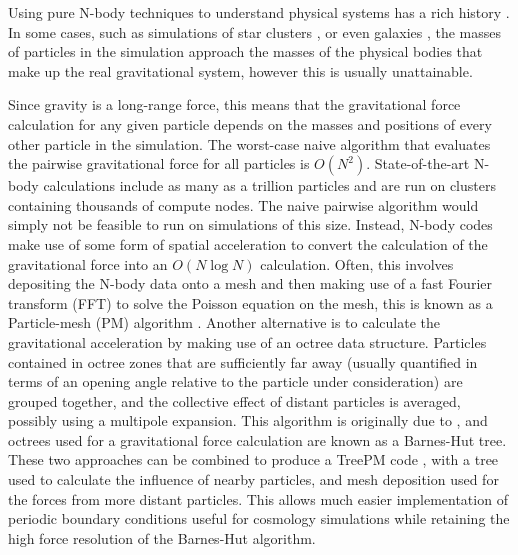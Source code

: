 \documentclass[11pt,twoside]{article}
\begin{document}
Using pure N-body techniques to understand physical systems has a rich history \citep[see e.g.\ ][]{holmberg1941, hoerner1960, peebles1970, press1974}. In some cases, such as simulations of star clusters \citep{wang2016}, or even galaxies \citep{bedorf2014}, the masses of particles in the simulation approach the masses of the physical bodies that make up the real gravitational system, however this is usually unattainable.

Since gravity is a long-range force, this means that the gravitational force calculation for any given particle depends on the masses and positions of every other particle in the simulation. The worst-case naive algorithm that evaluates the pairwise gravitational force for all particles is $O(N^2)$. State-of-the-art N-body calculations include as many as a trillion particles and are run on clusters containing thousands of compute nodes. The naive pairwise algorithm would simply not be feasible to run on simulations of this size. Instead, N-body codes make use of some form of spatial acceleration to convert the calculation of the gravitational force into an $O(N \log N)$ calculation. Often, this involves depositing the N-body data onto a mesh and then making use of a fast Fourier transform (FFT) to solve the Poisson equation on the mesh, this is known as a Particle-mesh (PM) algorithm \citep{hockney1988}. Another alternative is to calculate the gravitational acceleration by making use of an octree data structure. Particles contained in octree zones that are sufficiently far away (usually quantified in terms of an opening angle relative to the particle under consideration) are grouped together, and the collective effect of distant particles is averaged, possibly using a multipole expansion. This algorithm is originally due to \citet{barnes1986}, and octrees used for a gravitational force calculation are known as a Barnes-Hut tree. These two approaches can be combined to produce a TreePM code \citep{bagla2002}, with a tree used to calculate the influence of nearby particles, and mesh deposition used for the forces from more distant particles. This allows much easier implementation of periodic boundary conditions useful for cosmology simulations while retaining the high force resolution of the Barnes-Hut algorithm.
\end{document}
